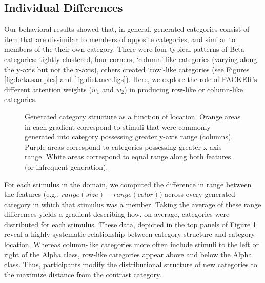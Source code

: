 \documentclass[10pt,letterpaper]{article}
\newcommand\inputpgf[2]{{
\let\pgfimageWithoutPath\pgfimage
\renewcommand{\pgfimage}[2][]{\pgfimageWithoutPath[##1]{#1/##2}}

}}
\begin{document}
\subsection{Individual Differences}
Our behavioral results showed that, in general, generated categories consist of item that are dissimilar to members of opposite categories, and similar to members of the their own category. There were four typical patterns of Beta categories: tightly clustered, four corners, `column'-like categories (varying along the y-axis but not the x-axis), others created `row'-like categories (see Figures \ref{fig:beta.samples} and \ref{fig:distance.figs}). Here, we explore the role of PACKER's different attention weights ($w_1$ and $w_2$) in producing row-like or column-like categories.

\begin{figure}[ht!]
    \begin{center}
    \inputpgf{figs/}{range-diff-gradient.pgf}
    \caption{Generated category structure as a function of location. Orange areas in each gradient correspond to stimuli that were commonly generated into category possessing greater y-axis range (columns). Purple areas correspond to categories possessing greater x-axis range. White areas correspond to equal range along both features (or infrequent generation).}
    \label{fig:range-diff-gradient}
    \end{center}
\end{figure}

For each stimulus in the domain, we computed the difference in range between the features (e.g., $range(size) - range(color)$) across every generated category in which that stimulus was a member. Taking the average of these range differences yields a gradient describing how, on average, categories were distributed for each stimulus. These data, depicted in the top panels of Figure \ref{fig:range-diff-gradient} reveal a highly systematic relationship between category structure and category location. Whereas column-like categories more often include stimuli to the left or right of the Alpha class, row-like categories appear above and below the Alpha class.  Thus, participants modify the distributional structure of new categories to the maximize distance from the contrast category.
\end{document}
